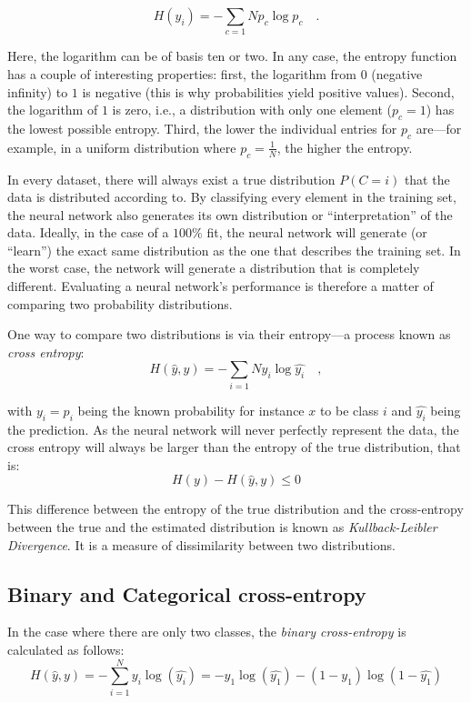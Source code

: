 \begin{equation}
H(y_i)=-\sum_{c=1}{N}p_c \log p_c\quad.
\end{equation}

Here, the logarithm can be of basis ten or two. In any case, the entropy function has a couple of interesting properties: first, the logarithm from $0$ (negative infinity) to $1$ is negative (this is why probabilities yield positive values). Second, the logarithm of $1$ is zero, i.e., a distribution with only one element ($p_c=1$) has the lowest possible entropy.
Third, the lower the individual entries for $p_c$ are---for example, in a uniform distribution where $p_c=\frac{1}{N}$, the higher the entropy.

In every dataset, there will always exist a true distribution $P(C=i)$ that the data is distributed according to. By classifying every element in the training set, the neural network also generates its own distribution or ``interpretation'' of the data.
Ideally, in the case of a $100\%$ fit, the neural network will generate (or ``learn'') the exact same distribution as the one that describes the training set. In the worst case, the network will generate a distribution that is completely different. Evaluating a neural network's performance is therefore a matter of comparing two probability distributions.

One way to compare two distributions is via their entropy---a process known as \textsl{cross entropy}:
\begin{equation}
H(\hat{y},y)=-\sum_{i=1}{N}y_i\log \hat{y_i}\quad ,
\end{equation}

with $y_i=p_i$ being the known probability for instance $x$ to be class $i$ and $\hat{y_i}$ being the prediction. As the neural network will never perfectly represent the data, the cross entropy will always be larger than the entropy of the true distribution, that is:
\begin{equation}
H(y)-H(\hat{y},y) \leq 0
\end{equation}

This difference between the entropy of the true distribution and the cross-entropy between the true and the estimated distribution is known as \textsl{Kullback-Leibler Divergence}. It is a measure of dissimilarity between two distributions.

\subsection{Binary and Categorical cross-entropy}
In the case where there are only two classes, the \textsl{binary cross-entropy} is calculated as follows:
\begin{equation}
H(\hat{y},y)=-\sum_{i=1}^Ny_i\log(\hat{y_i})=-y_1\log(\hat{y_1})-(1-y_1)\log(1-\hat{y_1})
\end{equation}

